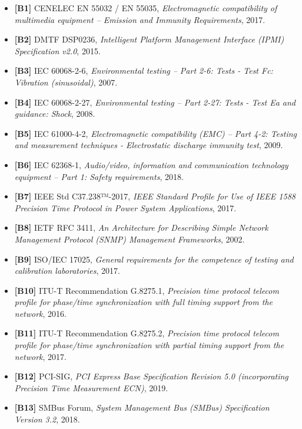 \begin{itemize}
\tightlist
\item
  \textbf{{[}B1{]}} CENELEC EN 55032 / EN 55035, \emph{Electromagnetic
  compatibility of multimedia equipment -- Emission and Immunity
  Requirements}, 2017.
\item
  \textbf{{[}B2{]}} DMTF DSP0236, \emph{Intelligent Platform Management
  Interface (IPMI) Specification v2.0}, 2015.
\item
  \textbf{{[}B3{]}} IEC 60068-2-6, \emph{Environmental testing -- Part
  2-6: Tests - Test Fc: Vibration (sinusoidal)}, 2007.
\item
  \textbf{{[}B4{]}} IEC 60068-2-27, \emph{Environmental testing -- Part
  2-27: Tests - Test Ea and guidance: Shock}, 2008.
\item
  \textbf{{[}B5{]}} IEC 61000-4-2, \emph{Electromagnetic compatibility
  (EMC) -- Part 4-2: Testing and measurement techniques - Electrostatic
  discharge immunity test}, 2009.
\item
  \textbf{{[}B6{]}} IEC 62368-1, \emph{Audio/video, information and
  communication technology equipment -- Part 1: Safety requirements},
  2018.
\item
  \textbf{{[}B7{]}} IEEE Std C37.238™-2017, \emph{IEEE Standard Profile
  for Use of IEEE 1588 Precision Time Protocol in Power System
  Applications}, 2017.
\item
  \textbf{{[}B8{]}} IETF RFC 3411, \emph{An Architecture for Describing
  Simple Network Management Protocol (SNMP) Management Frameworks},
  2002.
\item
  \textbf{{[}B9{]}} ISO/IEC 17025, \emph{General requirements for the
  competence of testing and calibration laboratories}, 2017.
\item
  \textbf{{[}B10{]}} ITU-T Recommendation G.8275.1, \emph{Precision time
  protocol telecom profile for phase/time synchronization with full
  timing support from the network}, 2016.
\item
  \textbf{{[}B11{]}} ITU-T Recommendation G.8275.2, \emph{Precision time
  protocol telecom profile for phase/time synchronization with partial
  timing support from the network}, 2017.
\item
  \textbf{{[}B12{]}} PCI-SIG, \emph{PCI Express Base Specification
  Revision 5.0 (incorporating Precision Time Measurement ECN)}, 2019.
\item
  \textbf{{[}B13{]}} SMBus Forum, \emph{System Management Bus (SMBus)
  Specification Version 3.2}, 2018.
\end{itemize}

